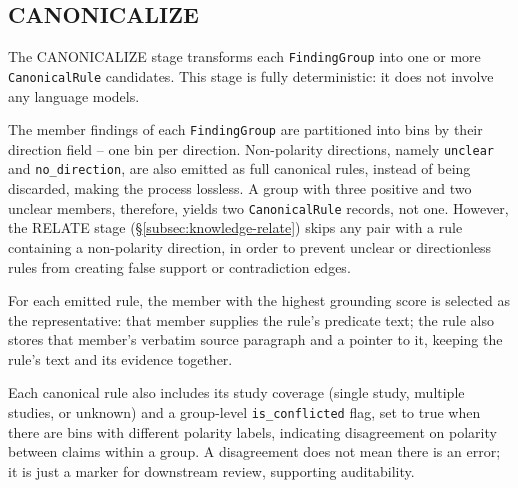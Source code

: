 \subsection{CANONICALIZE}\label{subsec:knowledge-canonicalize}

The CANONICALIZE stage transforms each \texttt{FindingGroup} into one or more \texttt{CanonicalRule} candidates. This stage is fully deterministic: it does not involve any language models. 

The member findings of each \texttt{FindingGroup} are partitioned into bins by their direction field -- one bin per direction. Non-polarity directions, namely \texttt{unclear} and \texttt{no\_direction}, are also emitted as full canonical rules, instead of being discarded, making the process lossless. A group with three positive and two unclear members, therefore, yields two \texttt{CanonicalRule} records, not one. However, the RELATE stage (§\ref{subsec:knowledge-relate}) skips any pair with a rule containing a non-polarity direction, in order to prevent unclear or directionless rules from creating false support or contradiction edges. 

For each emitted rule, the member with the highest grounding score is selected as the representative: that member supplies the rule's predicate text; the rule also stores that member's verbatim source paragraph and a pointer to it, keeping the rule's text and its evidence together. 

Each canonical rule also includes its study coverage (single study, multiple studies, or unknown) and a group-level \texttt{is\_conflicted} flag, set to true when there are bins with different polarity labels, indicating disagreement on polarity between claims within a group. A disagreement does not mean there is an error; it is just a marker for downstream review, supporting auditability. 